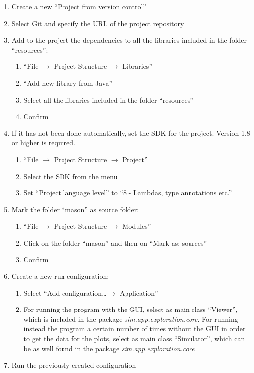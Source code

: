 \documentclass[a4paper, 10pt, conference]{ieeeconf}      %
\begin{document}
\begin{enumerate}
    \item Create a new ``Project from version control''
    \item Select Git and specify the URL of the project repository 
    \item Add to the project the dependencies to all the libraries included in the folder ``resources'': 
    \begin{enumerate}
        \item ``File $\rightarrow$ Project Structure $\rightarrow$ Libraries''
        \item ``Add new library from Java''
        \item Select all the libraries included in the folder ``resources''
        \item Confirm
    \end{enumerate}
    \item If it has not been done automatically, set the SDK for the project. Version 1.8 or higher is required.
    \begin{enumerate}
        \item ``File $\rightarrow$ Project Structure $\rightarrow$ Project''
        \item Select the SDK from the menu
        \item Set ``Project language level'' to ``8 - Lambdas, type annotations etc.''
    \end{enumerate}
    \item Mark the folder ``mason'' as source folder: 
    \begin{enumerate}
        \item ``File $\rightarrow$ Project Structure $\rightarrow$ Modules''
        \item Click on the folder ``mason'' and then on ``Mark as: sources''
        \item Confirm
    \end{enumerate}
    \item Create a new run configuration:
    \begin{enumerate}
        \item Select ``Add configuration\dots $\rightarrow$ Application''
        \item For running the program with the GUI, select as main class ``Viewer'', which is included in the package \emph{sim.app.exploration.core}. For running instead the program a certain number of times without the GUI in order to get the data for the plots, select as main class ``Simulator'', which can be as well found in the package \emph{sim.app.exploration.core}
    \end{enumerate}
    \item Run the previously created configuration
\end{enumerate}
\end{document}
